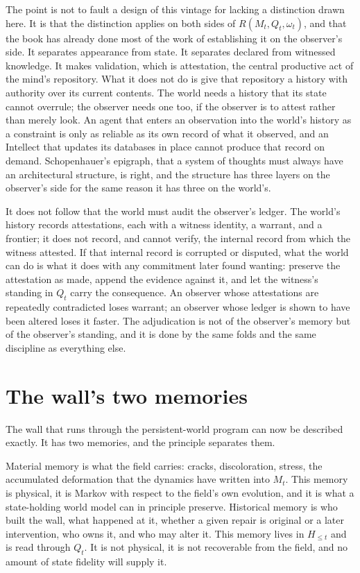 \documentclass[11pt]{article}
\begin{document}
The point is not to fault a design of this vintage for lacking a distinction drawn here. It is that the distinction applies on both sides of $R(M_t, Q_t, \omega_t)$, and that the book has already done most of the work of establishing it on the observer's side. It separates appearance from state. It separates declared from witnessed knowledge. It makes validation, which is attestation, the central productive act of the mind's repository. What it does not do is give that repository a history with authority over its current contents. The world needs a history that its state cannot overrule; the observer needs one too, if the observer is to attest rather than merely look. An agent that enters an observation into the world's history as a constraint is only as reliable as its own record of what it observed, and an Intellect that updates its databases in place cannot produce that record on demand. Schopenhauer's epigraph, that a system of thoughts must always have an architectural structure, is right, and the structure has three layers on the observer's side for the same reason it has three on the world's.

It does not follow that the world must audit the observer's ledger. The world's history records attestations, each with a witness identity, a warrant, and a frontier; it does not record, and cannot verify, the internal record from which the witness attested. If that internal record is corrupted or disputed, what the world can do is what it does with any commitment later found wanting: preserve the attestation as made, append the evidence against it, and let the witness's standing in $Q_t$ carry the consequence. An observer whose attestations are repeatedly contradicted loses warrant; an observer whose ledger is shown to have been altered loses it faster. The adjudication is not of the observer's memory but of the observer's standing, and it is done by the same folds and the same discipline as everything else.

\section{The wall's two memories}

The wall that runs through the persistent-world program can now be described exactly. It has two memories, and the principle separates them.

Material memory is what the field carries: cracks, discoloration, stress, the accumulated deformation that the dynamics have written into $M_t$. This memory is physical, it is Markov with respect to the field's own evolution, and it is what a state-holding world model can in principle preserve. Historical memory is who built the wall, what happened at it, whether a given repair is original or a later intervention, who owns it, and who may alter it. This memory lives in $H_{\leq t}$ and is read through $Q_t$. It is not physical, it is not recoverable from the field, and no amount of state fidelity will supply it.
\end{document}
